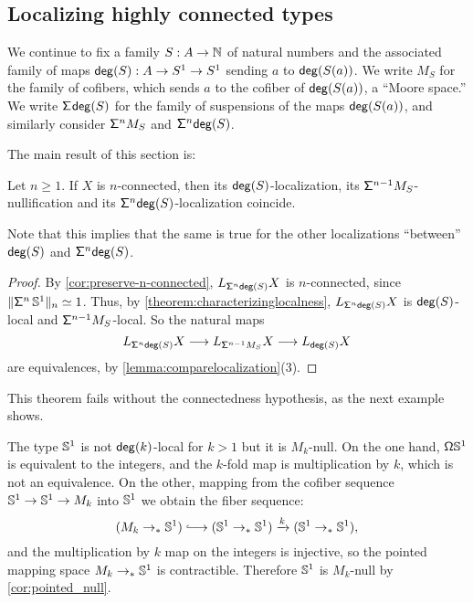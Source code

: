 \subsection{Localizing highly connected types}\label{ss:n-conn}

We continue to fix a family $S : A \to \N$ of natural numbers and the associated family
of maps $\degg(S) : A \to S^1 \to S^1$ sending $a$ to $\degg(S(a))$.
We write $M_S$ for the family of cofibers, which sends $a$ to the cofiber
of $\degg(S(a))$, a ``Moore space.''
We write $\susp{\degg(S)}$ for the family of suspensions of the maps $\degg(S(a))$,
and similarly consider $\suspsym^n M_S$ and $\suspsym^n \degg(S)$.

The main result of this section is:

\begin{thm}\label{theorem:localizationisnullification}
    Let $n\geq 1$.
    If $X$ is $n$-connected, then its
    $\degg(S)$-localization, its $\suspsym^{n-1} M_S$-nullification and
    its $\suspsym^n \degg(S)$-localization coincide.
\end{thm}

Note that this implies that the same is true for the other localizations ``between''
$\degg(S)$ and $\suspsym^n \degg(S)$.

\begin{proof}
By \cref{cor:preserve-n-connected},
$L_{\susp[n] \degg(S)} X$ is $n$-connected,
since $\trunc{n}{\suspsym^n \, \sphere{1}} \eqvsym 1$.
Thus, by \cref{theorem:characterizinglocalness}, $L_{\susp[n] \degg(S)} X$
is $\degg(S)$-local and $\suspsym^{n-1} M_S$-local.
So the natural maps
\[
  L_{\susp[n] \degg(S)} X \lra L_{\suspsym^{n-1} M_S} X \lra L_{\degg(S)} X
\]
are equivalences, by \cref{lemma:comparelocalization}(3).
\end{proof}

This theorem fails without the connectedness hypothesis, as the next example shows.

\begin{eg}
    The type $\sphere{1}$ is not $\degg(k)$-local for $k > 1$ but it is $M_k$-null.
    On the one hand, $\loopspacesym \sphere{1}$ is equivalent to the integers, and the $k$-fold map
    is multiplication by $k$, which is not an equivalence.
    On the other, mapping from the cofiber sequence $\sphere{1}\to \sphere{1} \to M_k$ into $\sphere{1}$ we
    obtain the fiber sequence:
    \[
        (M_k \to_\ast \sphere{1}) \longhookrightarrow (\sphere{1} \to_\ast \sphere{1}) \xrightarrow{k} (\sphere{1}\to_\ast \sphere{1}),
    \]
    and the multiplication by $k$ map on the integers is injective, so the pointed mapping space $M_k \to_\ast \sphere{1}$ is contractible. Therefore $\sphere{1}$ is $M_k$-null by \cref{cor:pointed_null}.
\end{eg}

